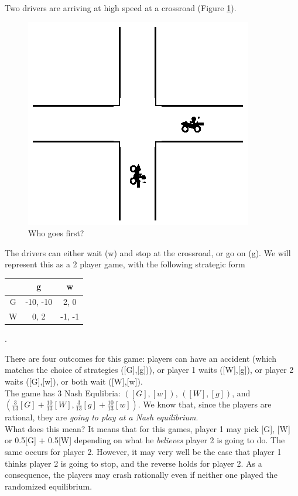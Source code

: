 \begin{example}
Two drivers are arriving at high speed at a crossroad (Figure \ref{ch6:fig:crossroads}).
\begin{figure}[!ht]
\centering
\includegraphics[scale=1.5]{crossroads.eps}
\caption{Who goes first?}
\label{ch6:fig:crossroads}
\end{figure}
The drivers can either wait (w) and stop at the crossroad, or go on (g). 
We will represent this as a 2 player game, with the following strategic form 
\begin{center}
\begin{tabular}{c | c  c}
& g & w\\
\hline
G & -10, -10 & 2, 0  \\
W & 0, 2 & -1, -1 
\end{tabular}
.
\end{center}

There are four outcomes for this game: players can have an accident (which matches the choice of strategies ([G],[g])), or player 1 waits ([W],[g]), or player 2 waits ([G],[w]), or both wait ([W],[w]). \\
The game has 3 Nash Equlibria: $([G],[w])$, $([W],[g])$, and $(\frac{3}{13}[G] + \frac{10}{13}[W], \frac{3}{13}[g] + \frac{10}{13}[w])$. We know that, since the players are rational, they are \emph{going to play at a Nash equilibrium}. \\
What does this mean? It means that for this games, player 1 may pick [G], [W] or 0.5[G] + 0.5[W] depending on what he \emph{believes} player 2 is going to do. The same occurs for player 2. 
However, it may very well be the case that player 1 thinks player 2 is going to stop, and the reverse holds for player 2. As a consequence, the players may crash rationally even if neither one played the randomized equilibrium.


\end{example}
